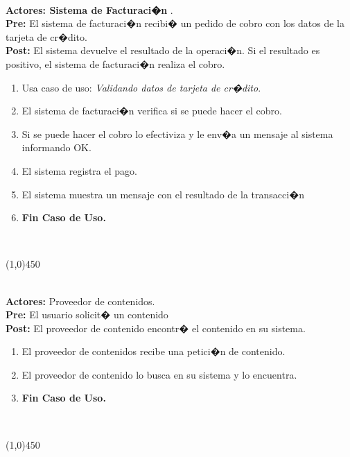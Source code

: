 \documentclass[11pt, a4paper, spanish]{article}
\begin{document}
{ \\ \textbf{Actores: Sistema de Facturaci�n} . \\ \textbf{Pre:} El sistema de facturaci�n recibi� un pedido de cobro con los datos de la tarjeta de cr�dito. \\ \textbf{Post:} El sistema devuelve el resultado de la operaci�n. Si el resultado es positivo, el sistema de facturaci�n realiza el cobro.\\  \begin{enumerate} \item Usa caso de uso: \emph{Validando datos de tarjeta de cr�dito}. \item El sistema de facturaci�n verifica si se puede hacer el cobro. \item Si se puede hacer el cobro lo efectiviza y le env�a un mensaje al sistema informando OK. \item El sistema registra el pago. \item El sistema muestra un mensaje con el resultado de la transacci�n \item \textbf{Fin Caso de Uso.} \end{enumerate}  \\   \begin{center} \line(1,0){450} \end{center}

 \\ \textbf{Actores: }Proveedor de contenidos. \\ \textbf{Pre:} El usuario solicit� un contenido \\ \textbf{Post:} El proveedor de contenido encontr� el contenido en su sistema.\\  \begin{enumerate} \item El proveedor de contenidos recibe una petici�n de contenido. \item El proveedor de contenido lo busca en su sistema y lo encuentra. \item \textbf{Fin Caso de Uso.} \end{enumerate}  \\   \begin{center} \line(1,0){450} \end{center}

}
\end{document}
